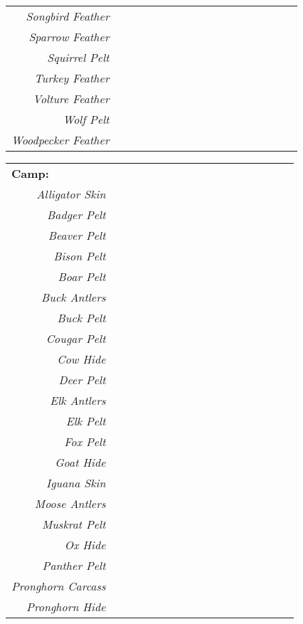 \documentclass{article}
\begin{document}
\begin{footnotesize}
\begin{tabular}{|r|c|c|c|c|c|c|c|c|c|c|c|c|c|c|c|c|}
	\cline{0-15}
	\textit{Songbird Feather} & & \\
	\cline{0-4}
	\textit{Sparrow Feather} & & & & \\
	\cline{0-6}
	\textit{Squirrel Pelt} & & & & &  & \\
	\cline{0-6}
	\textit{Turkey Feather} & & & & & & \\
	\cline{0-6}
	\textit{Volture Feather} & \\
	\cline{0-4}
	\textit{Wolf Pelt} & & & & \\
	\cline{0-6}
	\textit{Woodpecker Feather} & & & & & &  \\
	\cline{0-6}
\end{tabular}
\begin{tabular}{|r|c|c|c|c|c|c|c|c|c|c|c|c|c|c|c|c|}
	\cline{0-0}
	\multicolumn{0}{|l|}{\textbf{Camp:}}\\
	\cline{0-0}
	\cline{0-1}
	\textit{Alligator Skin} & \\
	\cline{0-1}
	\textit{Badger Pelt} & \\
	\cline{0-2}
	\textit{Beaver Pelt} & & \\
	\cline{0-2}
	\textit{Bison Pelt} & \\
	\cline{0-6}
	\textit{Boar Pelt} & & & & & & \\
	\cline{0-6}
	\textit{Buck Antlers} & \\
	\cline{0-1}
	\textit{Buck Pelt} & \\
	\cline{0-1}
	\textit{Cougar Pelt} & \\
	\cline{0-1}
	\textit{Cow Hide} & \\
	\cline{0-6}
	\textit{Deer Pelt} & & & & & & \\
	\cline{0-6}
	\textit{Elk Antlers} & \\
	\cline{0-2}
	\textit{Elk Pelt} & & \\
	\cline{0-2}
	\textit{Fox Pelt} & \\
	\cline{0-2}
	\textit{Goat Hide} & & \\
	\cline{0-2}
	\textit{Iguana Skin} & \\
	\cline{0-1}
	\textit{Moose Antlers} & \\
	\cline{0-1}
	\textit{Muskrat Pelt} & \\
	\cline{0-2}
	\textit{Ox Hide} & & \\
	\cline{0-2}
	\textit{Panther Pelt} & \\
	\cline{0-1}
	\textit{Pronghorn Carcass} & \\
	\cline{0-2}
	\textit{Pronghorn Hide} & & \\

\end{tabular}
\end{footnotesize}
\end{document}
